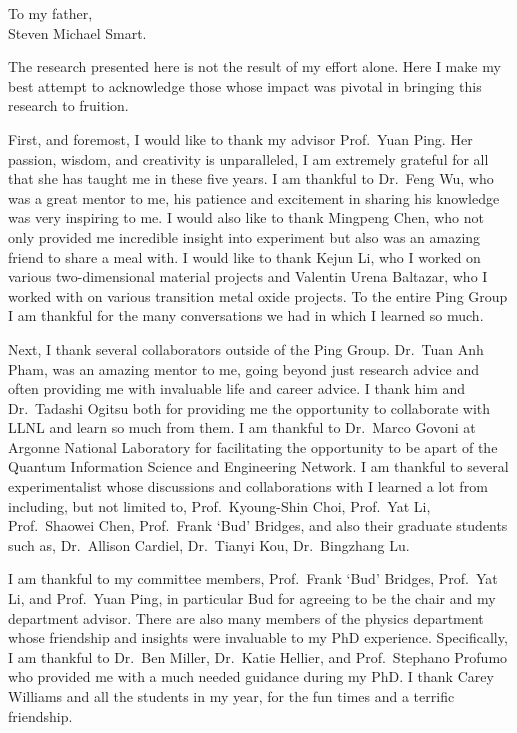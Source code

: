 \begin{dedication}
\vspace*{\fill}
\begin{center}
    To my father, \\
    Steven Michael Smart.
\end{center}
\vspace*{\fill}
\end{dedication}


\begin{acknowledgements}
    The research presented here is not the result of my effort alone. Here I make my best attempt to acknowledge those whose impact was pivotal in bringing this research to fruition.

    First, and foremost, I would like to thank my advisor Prof.\ Yuan Ping. Her passion, wisdom, and creativity is unparalleled, I am extremely grateful for all that she has taught me in these five years. I am thankful to Dr.\ Feng Wu, who was a great mentor to me, his patience and excitement in sharing his knowledge was very inspiring to me. I would also like to thank Mingpeng Chen, who not only provided me incredible insight into experiment but also was an amazing friend to share a meal with. I would like to thank Kejun Li, who I worked on various two-dimensional material projects and Valentin Urena Baltazar, who I worked with on various transition metal oxide projects. To the entire Ping Group I am thankful for the many conversations we had in which I learned so much.

    Next, I thank several collaborators outside of the Ping Group. Dr.\ Tuan Anh Pham, was an amazing mentor to me, going beyond just research advice and often providing me with invaluable life and career advice. I thank him and Dr.\ Tadashi Ogitsu both for providing me the opportunity to collaborate with LLNL and learn so much from them. I am thankful to Dr.\ Marco Govoni at Argonne National Laboratory for facilitating the opportunity to be apart of the Quantum Information Science and Engineering Network. I am thankful to several experimentalist whose discussions and collaborations with I learned a lot from including, but not limited to, Prof.\ Kyoung-Shin Choi, Prof.\ Yat Li, Prof.\ Shaowei Chen, Prof.\ Frank `Bud' Bridges, and also their graduate students such as, Dr.\ Allison Cardiel, Dr.\ Tianyi Kou, Dr.\ Bingzhang Lu.

    I am thankful to my committee members, Prof.\ Frank `Bud' Bridges, Prof.\ Yat Li, and Prof.\ Yuan Ping, in particular Bud for agreeing to be the chair and my department advisor. There are also many members of the physics department whose friendship and insights were invaluable to my PhD experience. Specifically, I am thankful to Dr.\ Ben Miller, Dr.\ Katie Hellier, and Prof.\ Stephano Profumo who provided me with a much needed guidance during my PhD. I thank Carey Williams and all the students in my year, for the fun times and a terrific friendship.


\end{acknowledgements}
